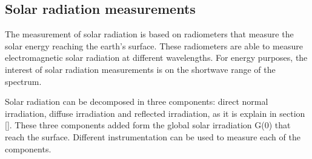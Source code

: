 \subsection{Solar radiation measurements}%

The measurement of solar radiation is based on radiometers that measure the solar energy reaching the earth's surface. These radiometers are able to measure electromagnetic solar radiation at different wavelengths. For energy purposes, the interest of solar radiation measurements is on the shortwave range of the spectrum.

Solar radiation can be decomposed in three components: direct normal irradiation, diffuse irradiation and reflected irradiation, as it is explain in section []. These three components added form the global solar irradiation G(0) that reach the surface. Different instrumentation can be used to measure each of the components.




